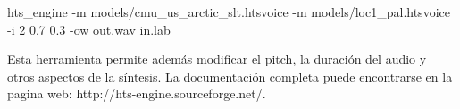 \begin{tcolorbox}
hts\_engine -m models/cmu\_us\_arctic\_slt.htsvoice -m models/loc1\_pal.htsvoice -i 2 0.7 0.3 -ow out.wav in.lab
\end{tcolorbox}

Esta herramienta permite además modificar el pitch, la duración del audio y otros aspectos de la síntesis. La documentación completa puede encontrarse en la pagina web: http://hts-engine.sourceforge.net/.